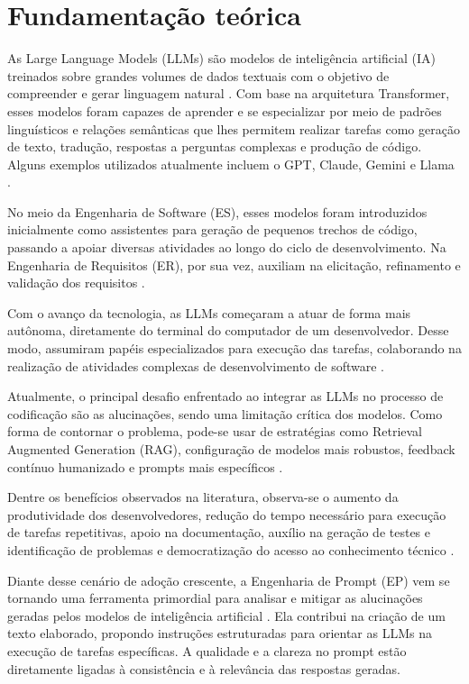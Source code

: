 \section{Fundamentação teórica}

As Large Language Models (LLMs) são modelos de inteligência artificial (IA) treinados sobre grandes volumes de dados textuais com o objetivo de compreender e gerar linguagem natural \cite{born2025revisao}. Com base na arquitetura Transformer, esses modelos foram capazes de aprender e se especializar por meio de padrões linguísticos e relações semânticas que lhes permitem realizar tarefas como geração de texto, tradução, respostas a perguntas complexas e produção de código. Alguns exemplos utilizados atualmente incluem o GPT, Claude, Gemini e Llama \cite{minaee_large_2024}.

No meio da Engenharia de Software (ES), esses modelos foram introduzidos inicialmente como assistentes para geração de pequenos trechos de código, passando a apoiar diversas atividades ao longo do ciclo de desenvolvimento. Na Engenharia de Requisitos (ER), por sua vez, auxiliam na elicitação, refinamento e validação dos requisitos \cite{pires_prompts_2025}.

Com o avanço da tecnologia, as LLMs começaram a atuar de forma mais autônoma, diretamente do terminal do computador de um desenvolvedor. Desse modo, assumiram papéis especializados para execução das tarefas, colaborando na realização de atividades complexas de desenvolvimento de software \cite{ribeiro_software_2025}.

Atualmente, o principal desafio enfrentado ao integrar as LLMs no processo de codificação são as alucinações, sendo uma limitação crítica dos modelos. Como forma de contornar o problema, pode-se usar de estratégias como Retrieval Augmented Generation (RAG), configuração de modelos mais robustos, feedback contínuo humanizado e prompts mais específicos \cite{minaee_large_2024}.

Dentre os benefícios observados na literatura, observa-se o aumento da produtividade dos desenvolvedores, redução do tempo necessário para execução de tarefas repetitivas, apoio na documentação, auxílio na geração de testes e identificação de problemas e democratização do acesso ao conhecimento técnico \cite{tolio_llms_2026}.

Diante desse cenário de adoção crescente, a Engenharia de Prompt (EP) vem se tornando uma ferramenta primordial para analisar e mitigar as alucinações geradas pelos modelos de inteligência artificial \cite{silva_engenharia_2024}. Ela contribui na criação de um texto elaborado, propondo instruções estruturadas para orientar as LLMs na execução de tarefas específicas. A qualidade e a clareza no prompt estão diretamente ligadas à consistência e à relevância das respostas geradas.

